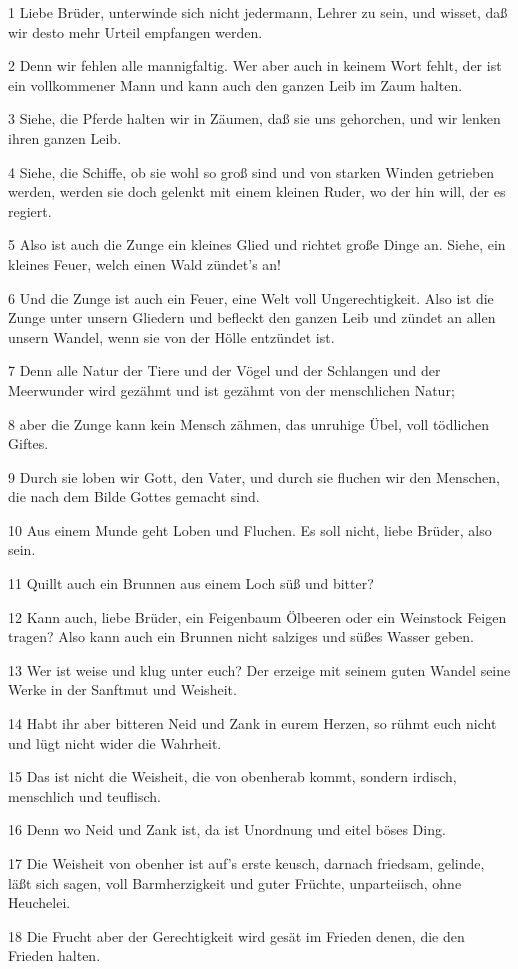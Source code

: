 \par 1 Liebe Brüder, unterwinde sich nicht jedermann, Lehrer zu sein, und wisset, daß wir desto mehr Urteil empfangen werden.
\par 2 Denn wir fehlen alle mannigfaltig. Wer aber auch in keinem Wort fehlt, der ist ein vollkommener Mann und kann auch den ganzen Leib im Zaum halten.
\par 3 Siehe, die Pferde halten wir in Zäumen, daß sie uns gehorchen, und wir lenken ihren ganzen Leib.
\par 4 Siehe, die Schiffe, ob sie wohl so groß sind und von starken Winden getrieben werden, werden sie doch gelenkt mit einem kleinen Ruder, wo der hin will, der es regiert.
\par 5 Also ist auch die Zunge ein kleines Glied und richtet große Dinge an. Siehe, ein kleines Feuer, welch einen Wald zündet's an!
\par 6 Und die Zunge ist auch ein Feuer, eine Welt voll Ungerechtigkeit. Also ist die Zunge unter unsern Gliedern und befleckt den ganzen Leib und zündet an allen unsern Wandel, wenn sie von der Hölle entzündet ist.
\par 7 Denn alle Natur der Tiere und der Vögel und der Schlangen und der Meerwunder wird gezähmt und ist gezähmt von der menschlichen Natur;
\par 8 aber die Zunge kann kein Mensch zähmen, das unruhige Übel, voll tödlichen Giftes.
\par 9 Durch sie loben wir Gott, den Vater, und durch sie fluchen wir den Menschen, die nach dem Bilde Gottes gemacht sind.
\par 10 Aus einem Munde geht Loben und Fluchen. Es soll nicht, liebe Brüder, also sein.
\par 11 Quillt auch ein Brunnen aus einem Loch süß und bitter?
\par 12 Kann auch, liebe Brüder, ein Feigenbaum Ölbeeren oder ein Weinstock Feigen tragen? Also kann auch ein Brunnen nicht salziges und süßes Wasser geben.
\par 13 Wer ist weise und klug unter euch? Der erzeige mit seinem guten Wandel seine Werke in der Sanftmut und Weisheit.
\par 14 Habt ihr aber bitteren Neid und Zank in eurem Herzen, so rühmt euch nicht und lügt nicht wider die Wahrheit.
\par 15 Das ist nicht die Weisheit, die von obenherab kommt, sondern irdisch, menschlich und teuflisch.
\par 16 Denn wo Neid und Zank ist, da ist Unordnung und eitel böses Ding.
\par 17 Die Weisheit von obenher ist auf's erste keusch, darnach friedsam, gelinde, läßt sich sagen, voll Barmherzigkeit und guter Früchte, unparteiisch, ohne Heuchelei.
\par 18 Die Frucht aber der Gerechtigkeit wird gesät im Frieden denen, die den Frieden halten.

